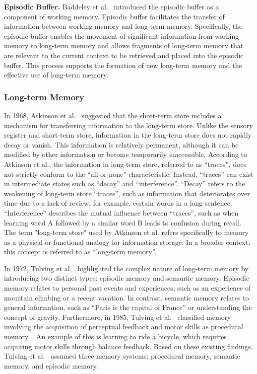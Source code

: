 \documentclass[journal,hideappendix]{vgtc}
\newenvironment{j_itemize}{
\begin{itemize}[]
  \setlength{\itemsep}{3pt}
  \setlength{\parskip}{0pt}
  \setlength{\parsep}{0pt}
}{\end{itemize}}
\begin{document}
\begin{j_itemize}
    \item[$\bullet$] \textbf{Episodic Buffer.} Baddeley et al.~\cite{baddeley2000episodic} introduced the episodic buffer as a component of working memory. Episodic buffer facilitates the transfer of information between working memory and long-term memory. Specifically, the episodic buffer enables the movement of significant information from working memory to long-term memory and allows fragments of long-term memory that are relevant to the current context to be retrieved and placed into the episodic buffer. This process supports the formation of new long-term memory and the effective use of long-term memory.
    
\end{j_itemize}


\subsubsection{Long-term Memory}
\label{sec:human_memory:hierarchy:long_term_memory}

In 1968, Atkinson et al.~\cite{atkinson1968human} suggested that the short-term store includes a mechanism for transferring information to the long-term store. Unlike the sensory register and short-term store, information in the long-term store does not rapidly decay or vanish. This information is relatively permanent, although it can be modified by other information or become temporarily inaccessible.
According to Atkinson et al., the information in long-term store, referred to as ``traces'', does not strictly conform to the ``all-or-none'' characteristic. Instead, ``traces'' can exist in intermediate states such as ``decay'' and ``interference''. ``Decay'' refers to the weakening of long-term store ``traces'', such as information that deteriorates over time due to a lack of review, for example, certain words in a long sentence. ``Interference'' describes the mutual influence between ``traces'', such as when learning word A followed by a similar word B leads to confusion during recall. The term "long-term store" used by Atkinson et al. refers specifically to memory as a physical or functional analogy for information storage. In a broader context, this concept is referred to as ``long-term memory''.

In 1972, Tulving et al.~\cite{tulving1972episodic} highlighted the complex nature of long-term memory by introducing two distinct types: episodic memory and semantic memory. Episodic memory relates to personal past events and experiences, such as an experience of mountain climbing or a recent vacation. In contrast, semantic memory relates to general information, such as ``Paris is the capital of France'' or understanding the concept of gravity.
Furthermore, in 1985, Tulving et al.~\cite{tulving1985memory} classified memory involving the acquisition of perceptual feedback and motor skills as procedural memory~\cite{winograd1972understanding,tulving1983elements,anderson2013language}. An example of this is learning to ride a bicycle, which requires acquiring motor skills through balance feedback. Based on these existing findings, Tulving et al.~\cite{tulving1985memory} assumed three memory systems: procedural memory, semantic memory, and episodic memory.
\end{document}
